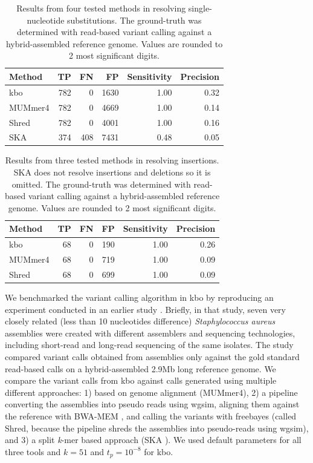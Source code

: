 \documentclass[unnumsec,webpdf,contemporary,large]{oup-authoring-template}%
\theoremstyle{thmstyleone}%
\theoremstyle{thmstyletwo}%
\theoremstyle{thmstylethree}%
\newcommand{\kbo}{{\sf kbo}}
\begin{document}
\begin{table}[]
\begin{tabular}{lrrrrr}
Method & TP  & FN  & FP   & Sensitivity & Precision \\
\hline
\kbo    & 782 & 0   & 1630 & 1.00    & 0.32  \\
MUMmer4 & 782 & 0   & 4669 & 1.00    & 0.14  \\
Shred  & 782 & 0   & 4001 & 1.00    & 0.16  \\
SKA    & 374 & 408 & 7431 & 0.48    & 0.05
\end{tabular}
\caption{Results from four tested methods in resolving single-nucleotide substitutions. The ground-truth was determined with read-based variant calling against a hybrid-assembled reference genome. Values are rounded to 2 most significant digits.}
\label{vc-snps}
\end{table}
\begin{table}[]
\begin{tabular}{lrrrrr}
Method & TP & FN & FP  & Sensitivity & Precision \\
\hline
\kbo    & 68 & 0  & 190 & 1.00    & 0.26  \\
MUMmer4 & 68 & 0  & 719 & 1.00    & 0.09  \\
Shred  & 68 & 0  & 699 & 1.00    & 0.09  
\end{tabular}
\caption{Results from three tested methods in resolving insertions. SKA does not resolve insertions and deletions so it is omitted. The ground-truth was determined with read-based variant calling against a hybrid-assembled reference genome. Values are rounded to 2 most significant digits.}
\label{vc-indels}
\end{table}

We benchmarked the variant calling algorithm in {\sf kbo} by reproducing an experiment conducted in an earlier study \cite{wick2025reads}. Briefly, in that study, seven very closely related (less than 10 nucleotides difference) \textit{Staphylococcus aureus} assemblies were created with different assemblers and sequencing technologies, including short-read and long-read sequencing of the same isolates. The study compared variant calls obtained from assemblies only against the gold standard read-based calls on a hybrid-assembled 2.9Mb long reference genome. We compare the variant calls from {\sf kbo} against calls generated using multiple different approaches: 1) based on genome alignment (MUMmer4\cite{marccais2018mummer4}), 2) a pipeline converting the assemblies into pseudo reads using wgsim, aligning them against the reference with BWA-MEM \cite{li2013aligning}, and calling the variants with freebayes \cite{garrison2012haplotype} (called Shred, because the pipeline shreds the assemblies into pseudo-reads using wgsim), and 3) a split \emph{k}-mer based approach (SKA \cite{derelle2024seamless}). We used default parameters for all three tools and $k = 51$ and $t_p = 10^{-8}$ for {\sf kbo}.
\end{document}
